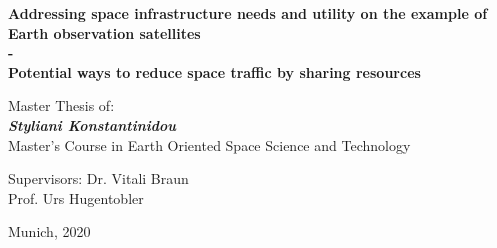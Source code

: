 \vspace{3cm}
\begin{center}
\Large{\textbf{Addressing space infrastructure needs and utility on the example of Earth observation satellites \\- \\}}
\Large{\textbf{Potential ways to reduce space traffic by sharing resources}}
\end{center}
\vspace{2.1cm}
\begin{center}
\large{Master Thesis of:\\
\textit{\textbf{Styliani Konstantinidou}} \\}
\vspace{1cm}
\large{Master's Course in Earth Oriented Space Science and Technology}
\end{center}

\vspace{2.5cm}
\begin{flushleft}
\large{Supervisors: Dr. Vitali Braun \\ \hspace*{2.7cm}Prof. Urs Hugentobler}
\end{flushleft}

\vfill
\begin{center}
\normalsize Munich, 2020
\end{center}



